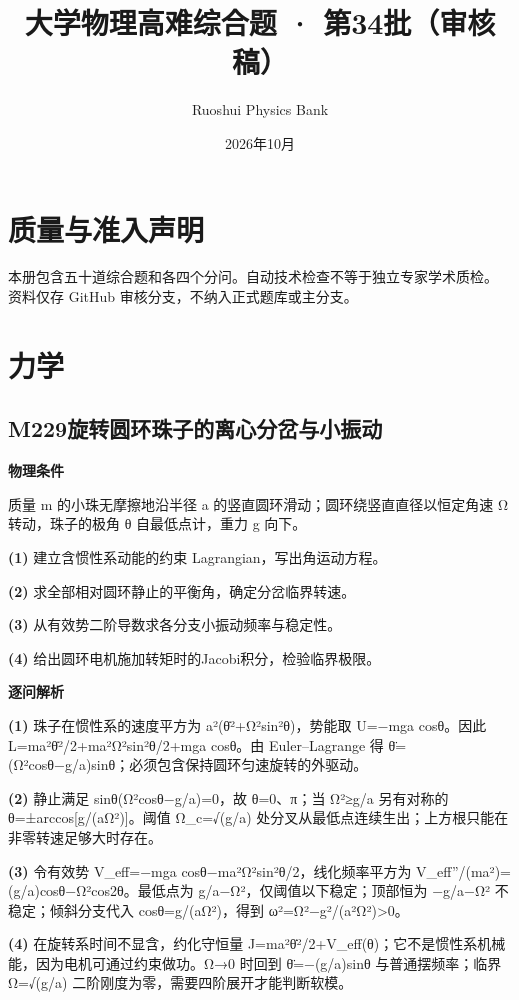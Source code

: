 \documentclass[UTF8,a4paper,11pt,oneside,openany]{ctexbook}
\begin{document}
\title{大学物理高难综合题 · 第34批（审核稿）}
\author{Ruoshui Physics Bank}
\date{2026年10月}
\maketitle
\tableofcontents
\chapter*{质量与准入声明}
本册包含五十道综合题和各四个分问。自动技术检查不等于独立专家学术质检。
资料仅存 GitHub 审核分支，不纳入正式题库或主分支。

\chapter{力学}
\section*{M229\quad 旋转圆环珠子的离心分岔与小振动}
\textbf{物理条件}\par 质量 m 的小珠无摩擦地沿半径 a 的竖直圆环滑动；圆环绕竖直直径以恒定角速 Ω 转动，珠子的极角 θ 自最低点计，重力 g 向下。
\par\noindent\textbf{(1)} 建立含惯性系动能的约束 Lagrangian，写出角运动方程。
\par\noindent\textbf{(2)} 求全部相对圆环静止的平衡角，确定分岔临界转速。
\par\noindent\textbf{(3)} 从有效势二阶导数求各分支小振动频率与稳定性。
\par\noindent\textbf{(4)} 给出圆环电机施加转矩时的Jacobi积分，检验临界极限。

\par\medskip\noindent\textbf{逐问解析}
\par\noindent\textbf{(1)} 珠子在惯性系的速度平方为 a²(θ̇²+Ω²sin²θ)，势能取 U=−mga cosθ。因此 L=ma²θ̇²/2+ma²Ω²sin²θ/2+mga cosθ。由 Euler–Lagrange 得 θ̈=(Ω²cosθ−g/a)sinθ；必须包含保持圆环匀速旋转的外驱动。
\par\noindent\textbf{(2)} 静止满足 sinθ(Ω²cosθ−g/a)=0，故 θ=0、π；当 Ω²≥g/a 另有对称的 θ=±arccos[g/(aΩ²)]。阈值 Ω\_c=√(g/a) 处分叉从最低点连续生出；上方根只能在非零转速足够大时存在。
\par\noindent\textbf{(3)} 令有效势 V\_eff=−mga cosθ−ma²Ω²sin²θ/2，线化频率平方为 V\_eff''/(ma²)= (g/a)cosθ−Ω²cos2θ。最低点为 g/a−Ω²，仅阈值以下稳定；顶部恒为 −g/a−Ω² 不稳定；倾斜分支代入 cosθ=g/(aΩ²)，得到 ω²=Ω²−g²/(a²Ω²)>0。
\par\noindent\textbf{(4)} 在旋转系时间不显含，约化守恒量 J=ma²θ̇²/2+V\_eff(θ)；它不是惯性系机械能，因为电机可通过约束做功。Ω→0 时回到 θ̈=−(g/a)sinθ 与普通摆频率；临界 Ω=√(g/a) 二阶刚度为零，需要四阶展开才能判断软模。
\end{document}
